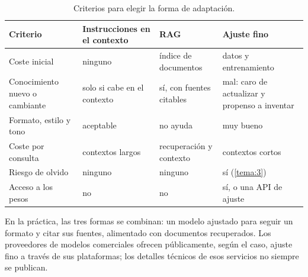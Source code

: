 \begin{table}[h]
\centering\small
\caption{Criterios para elegir la forma de adaptación.}\label{tab:eleccion}
\begin{tabularx}{\textwidth}{@{}>{\raggedright\arraybackslash}p{3.3cm}>{\raggedright\arraybackslash}X>{\raggedright\arraybackslash}X>{\raggedright\arraybackslash}X@{}}
\toprule
Criterio & Instrucciones en el contexto & RAG & Ajuste fino \\
\midrule
Coste inicial & ninguno & índice de documentos & datos y entrenamiento \\
Conocimiento nuevo o cambiante & solo si cabe en el contexto & sí, con fuentes citables & mal: caro de actualizar y propenso a inventar \\
Formato, estilo y tono & aceptable & no ayuda & muy bueno \\
Coste por consulta & contextos largos & recuperación y contexto & contextos cortos \\
Riesgo de olvido & ninguno & ninguno & sí (\cref{tema:3}) \\
Acceso a los pesos & no & no & sí, o una API de ajuste \\
\bottomrule
\end{tabularx}
\end{table}

\addtocounter{figure}{1}%

En la práctica, las tres formas se combinan: un modelo ajustado para seguir un formato y citar sus fuentes, alimentado con documentos recuperados. Los proveedores de modelos comerciales ofrecen públicamente, según el caso, ajuste fino a través de sus plataformas; los detalles técnicos de esos servicios no siempre se publican.

